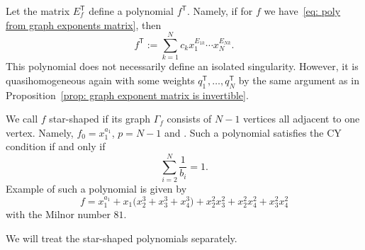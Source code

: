 \documentclass[pdftex]{sigma}
\numberwithin{equation}{section}
\begin{document}
Let the matrix $E_f^{\mathsf{T}}$ define a polynomial $f^{\mathsf{T}}$. Namely, if for $f$ we have~\eqref{eq: poly from graph exponents matrix}, then
\[
	f^{\mathsf{T}} := \sum_{k=1}^N c_k x_1^{E_{1k}} \cdots x_N^{E_{Nk}}.
\]
This polynomial does not necessarily define an isolated singularity. However, it is quasihomogeneous again with some weights $q_1^{\mathsf{T}}, \dots, q_N^{\mathsf{T}}$ by the same argument as in Proposition~\ref{prop: graph exponent matrix is invertible}.

We call $f$ star-shaped if its graph $\Gamma_f$ consists of $N-1$ vertices all adjacent to one vertex. Namely, $f_0 = x_1^{a_1}$, $p=N-1$ and . Such a polynomial satisfies the CY condition if and only if
\[
 \sum_{i=2}^N \frac{1}{b_i} = 1.
\]
Example of such a polynomial is given by
\[
 f = x_1^{a_1} + x_1 \bigl(x_2^3 +x_3^3 +x_4^3\bigr) + x_2^2x_3^2+ x_2^2x_4^2+ x_3^2x_4^2
\]
with the Milnor number $81$.

We will treat the star-shaped polynomials separately.
\end{document}
